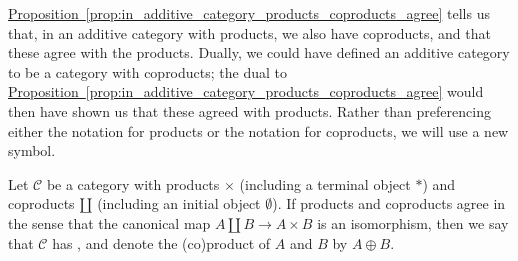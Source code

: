 \documentclass[main.tex]{subfiles}
\begin{document}
\hyperref[prop:in_additive_category_products_coproducts_agree]{Proposition~\ref*{prop:in_additive_category_products_coproducts_agree}} tells us that, in an additive category with products, we also have coproducts, and that these agree with the products. Dually, we could have defined an additive category to be a category with coproducts; the dual to \hyperref[prop:in_additive_category_products_coproducts_agree]{Proposition~\ref*{prop:in_additive_category_products_coproducts_agree}} would then have shown us that these agreed with products. Rather than preferencing either the notation for products or the notation for coproducts, we will use a new symbol.

\begin{definition}
  \label{def:direct_sum}
  Let $\mathcal{C}$ be a category with products \(\times\) (including a terminal object \(*\)) and coproducts \(\amalg\) (including an initial object \(\emptyset\)). If products and coproducts agree in the sense that the canonical map $A \amalg B \to A \times B$ is an isomorphism, then we say that $\mathcal{C}$ has , and denote the (co)product of $A$ and $B$ by $A \oplus B$.
\end{definition}
\end{document}
